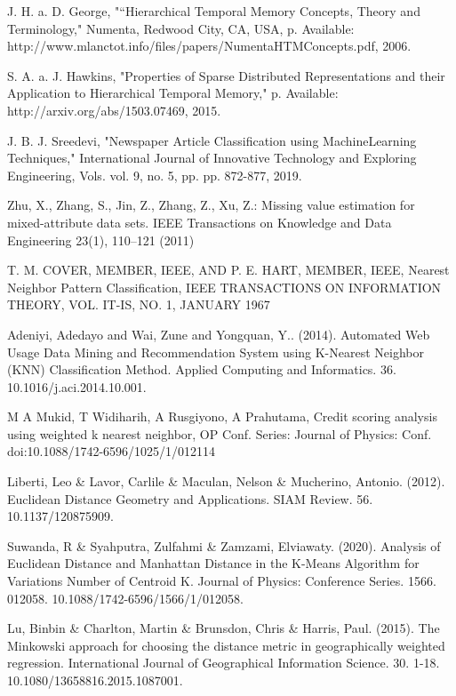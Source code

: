 \documentclass[conference]{IEEEtran}
\begin{document}
\begin{thebibliography}{1}
J. H. a. D. George, "“Hierarchical Temporal Memory Concepts, Theory and Terminology," Numenta, Redwood City, CA, USA, p. Available: http://www.mlanctot.info/files/papers/NumentaHTMConcepts.pdf, 2006.

S. A. a. J. Hawkins, "Properties of Sparse Distributed Representations and their Application to Hierarchical Temporal Memory," p. Available: http://arxiv.org/abs/1503.07469, 2015.

J. B. J. Sreedevi, "Newspaper Article Classification using MachineLearning Techniques," International Journal of Innovative Technology and Exploring Engineering, Vols. vol. 9, no. 5, pp. pp. 872-877, 2019.

Zhu, X., Zhang, S., Jin, Z., Zhang, Z., Xu, Z.: Missing value estimation for mixed-attribute data sets. IEEE Transactions on Knowledge and Data Engineering 23(1), 110–121 (2011)

T. M. COVER, MEMBER, IEEE, AND P. E. HART, MEMBER, IEEE, Nearest Neighbor Pattern Classification, IEEE TRANSACTIONS ON INFORMATION THEORY, VOL. IT-IS, NO. 1, JANUARY 1967

Adeniyi, Adedayo and Wai, Zune and Yongquan, Y.. (2014). Automated Web Usage Data Mining and Recommendation System using K-Nearest Neighbor (KNN) Classification Method. Applied Computing and Informatics. 36. 10.1016/j.aci.2014.10.001. 

M A Mukid, T Widiharih, A Rusgiyono, A Prahutama, Credit scoring analysis using weighted k nearest neighbor, OP Conf. Series: Journal of Physics: Conf. doi:10.1088/1742-6596/1025/1/012114

Liberti, Leo \& Lavor, Carlile \& Maculan, Nelson \& Mucherino, Antonio. (2012). Euclidean Distance Geometry and Applications. SIAM Review. 56. 10.1137/120875909. 

Suwanda, R \& Syahputra, Zulfahmi \& Zamzami, Elviawaty. (2020). Analysis of Euclidean Distance and Manhattan Distance in the K-Means Algorithm for Variations Number of Centroid K. Journal of Physics: Conference Series. 1566. 012058. 10.1088/1742-6596/1566/1/012058. 

Lu, Binbin \& Charlton, Martin \& Brunsdon, Chris \& Harris, Paul. (2015). The Minkowski approach for choosing the distance metric in geographically weighted regression. International Journal of Geographical Information Science. 30. 1-18. 10.1080/13658816.2015.1087001. 


\end{thebibliography}
\end{document}
